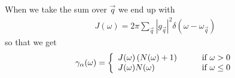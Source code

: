 When we take the sum over $\vec{q}$ we end up with 
\begin{align}
  J(\omega) = 2\pi \sum_\vec{q} |g_\vec{q}|^2 \delta(\omega-\omega_\vec{q})
\end{align}
so that we get
\begin{align}
  \gamma_\alpha(\omega) = \left\{
    \begin{array}{l l}
    J(\omega)\left(N(\omega) + 1\right) & \qquad \text{if $\omega > 0$}\\
    J(\omega)N(\omega) & \qquad \text{if $\omega \leq 0$}
  \end{array} \right.
\end{align}

